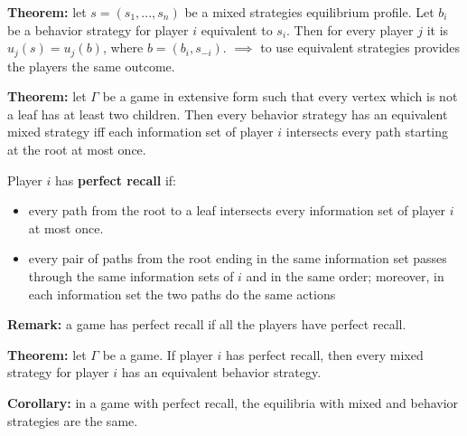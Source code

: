 \bigskip
\noindent \textbf{Theorem:} let $s = (s_1,...,s_n)$ be a mixed strategies 
equilibrium profile. Let $b_i$ be a behavior strategy for player $i$ equivalent 
to $s_i$. Then for every player $j$ it is $u_j(s) = u_j(b)$, where 
$b = (b_i,s_{-i})$.
\noindent $\implies$ to use equivalent strategies provides the players the same 
outcome. 

\bigskip
\noindent \textbf{Theorem:} let $\Gamma$ be a game in extensive form such that 
every vertex which is not a leaf has at least two children. Then every behavior 
strategy has an equivalent mixed strategy iff each information set of player $i$ 
intersects every path starting at the root at most once.

\bigskip
\noindent Player $i$ has \textbf{perfect recall} if:
\begin{itemize}
	\item every path from the root to a leaf intersects every information set of 
	player $i$ at most once.
	\item every pair of paths from the root ending in the same information set 
	passes through the same information sets of $i$ and in the same order; 
	moreover, in each information set the two paths do the same actions
\end{itemize}

\noindent \textbf{Remark:} a game has perfect recall if all the players have 
perfect recall.

\bigskip
\noindent \textbf{Theorem:} let $\Gamma$ be a game. If player $i$ has perfect 
recall, then every mixed strategy for player $i$ has an equivalent behavior 
strategy.

\bigskip
\noindent \textbf{Corollary:} in a game with perfect recall, the equilibria with 
mixed and behavior strategies are the same.

%
